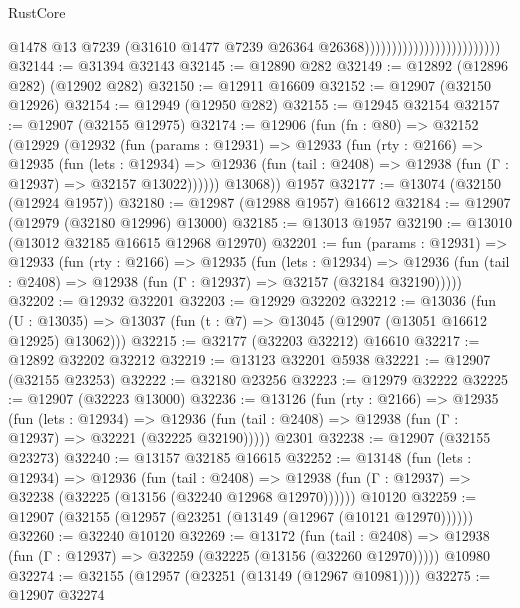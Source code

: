 \begin{lexlean}{RustCore}
\begin{coremodule}
                                                    @1478
                                                    @13
                                                    @7239
                                                    (@31610
                                                      @1477
                                                      @7239
                                                      @26364
                                                      @26368)))))))))))))))))))))))))
@32144 := @31394 @32143
@32145 := @12890 @282
@32149 := @12892 (@12896 @282) (@12902 @282)
@32150 := @12911 @16609
@32152 := @12907 (@32150 @12926)
@32154 := @12949 (@12950 @282)
@32155 := @12945 @32154
@32157 := @12907 (@32155 @12975)
@32174 := @12906
    (fun (fn : @80) =>
    @32152
      (@12929
        (@12932
          (fun (params : @12931) =>
          @12933
            (fun (rty : @2166) =>
            @12935
              (fun (lets : @12934) =>
              @12936 (fun (tail : @2408) => @12938 (fun (Γ : @12937) => @32157 @13022))))))
        @13068))
    @1957
@32177 := @13074 (@32150 (@12924 @1957))
@32180 := @12987 (@12988 @1957) @16612
@32184 := @12907 (@12979 (@32180 @12996) @13000)
@32185 := @13013 @1957
@32190 := @13010 (@13012 @32185 @16615 @12968 @12970)
@32201 := fun (params : @12931) =>
  @12933
    (fun (rty : @2166) =>
    @12935
      (fun (lets : @12934) =>
      @12936 (fun (tail : @2408) => @12938 (fun (Γ : @12937) => @32157 (@32184 @32190)))))
@32202 := @12932 @32201
@32203 := @12929 @32202
@32212 := @13036
    (fun (U : @13035) => @13037 (fun (t : @7) => @13045 (@12907 (@13051 @16612 @12925) @13062)))
@32215 := @32177 (@32203 @32212) @16610
@32217 := @12892 @32202 @32212
@32219 := @13123 @32201 @5938
@32221 := @12907 (@32155 @23253)
@32222 := @32180 @23256
@32223 := @12979 @32222
@32225 := @12907 (@32223 @13000)
@32236 := @13126
    (fun (rty : @2166) =>
    @12935
      (fun (lets : @12934) =>
      @12936 (fun (tail : @2408) => @12938 (fun (Γ : @12937) => @32221 (@32225 @32190)))))
    @2301
@32238 := @12907 (@32155 @23273)
@32240 := @13157 @32185 @16615
@32252 := @13148
    (fun (lets : @12934) =>
    @12936
      (fun (tail : @2408) =>
      @12938 (fun (Γ : @12937) => @32238 (@32225 (@13156 (@32240 @12968 @12970))))))
    @10120
@32259 := @12907 (@32155 (@12957 (@23251 (@13149 (@12967 (@10121 @12970))))))
@32260 := @32240 @10120
@32269 := @13172
    (fun (tail : @2408) => @12938 (fun (Γ : @12937) => @32259 (@32225 (@13156 (@32260 @12970)))))
    @10980
@32274 := @32155 (@12957 (@23251 (@13149 (@12967 @10981))))
@32275 := @12907 @32274

\end{coremodule}
\end{lexlean}
